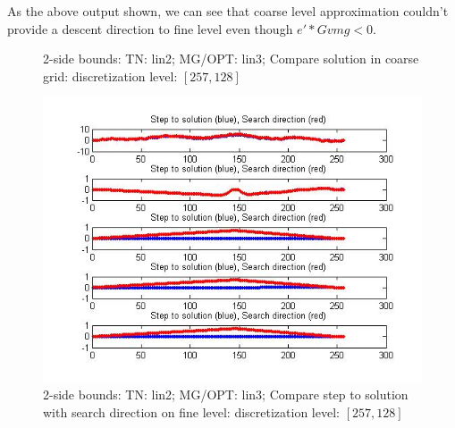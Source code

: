 \documentclass[10pt]{article}
\begin{document}
As the above output shown, we can see that coarse level approximation couldn't provide a descent direction to fine level even though $e'*Gvmg<0$. 

\begin{figure}[H]
  \centering
  \caption{2-side bounds: TN: lin2; MG/OPT: lin3; Compare solution in coarse grid: discretization level: $[257,128]$}
  \label{fig:coarse23}
\end{figure}

\begin{figure}
  \centering
  \includegraphics[width=1\textwidth]{finedirvs23}
  \caption{2-side bounds: TN: lin2; MG/OPT: lin3; Compare step to solution with search direction on fine level: discretization level: $[257,128]$}
  \label{fig:fine23}
\end{figure}
\end{document}
